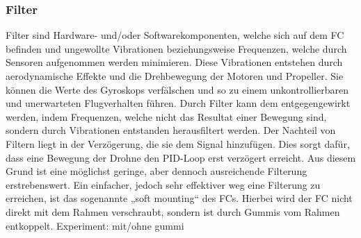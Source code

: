 \subsubsection[Filter]{Filter}
     Filter sind Hardware- und/oder Softwarekomponenten, welche sich auf dem FC befinden und ungewollte Vibrationen beziehungsweise Frequenzen, welche durch Sensoren aufgenommen werden minimieren. Diese Vibrationen entstehen durch aerodynamische Effekte und die Drehbewegung der Motoren und Propeller. Sie können die Werte des Gyroskops verfälschen und so zu einem unkontrollierbaren und unerwarteten Flugverhalten führen. Durch Filter kann dem entgegengewirkt werden, indem Frequenzen, welche nicht das Resultat einer Bewegung sind, sondern durch Vibrationen entstanden herausfiltert werden. Der Nachteil von Filtern liegt in der Verzögerung, die sie dem Signal hinzufügen. Dies sorgt dafür, dass eine Bewegung der Drohne den PID-Loop erst verzögert erreicht. Aus diesem Grund ist eine möglichst geringe, aber dennoch ausreichende Filterung erstrebenswert. Ein einfacher, jedoch sehr effektiver weg eine Filterung zu erreichen, ist das sogenannte „soft mounting“ des FCs. Hierbei wird der FC nicht direkt mit dem Rahmen verschraubt, sondern ist durch Gummis vom Rahmen entkoppelt. Experiment: mit/ohne gummi
     \\ \\
     

